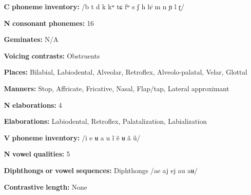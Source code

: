 \begin{styleBody}
\textbf{C} \textbf{phoneme} \textbf{inventory:} /b t d k kʷ tɕ fʷ s ʃ h hʲ m n ɲ l ɽ/
\end{styleBody}

\begin{styleBody}
\textbf{N} \textbf{consonant} \textbf{phonemes:} 16
\end{styleBody}

\begin{styleBody}
\textbf{Geminates:} N/A
\end{styleBody}

\begin{styleBody}
\textbf{Voicing} \textbf{contrasts:} Obstruents
\end{styleBody}

\begin{styleBody}
\textbf{Places:} Bilabial, Labiodental, Alveolar, Retroflex, Alveolo-palatal, Velar, Glottal
\end{styleBody}

\begin{styleBody}
\textbf{Manners:} Stop, Affricate, Fricative, Nasal, Flap/tap, Lateral approximant
\end{styleBody}

\begin{styleBody}
\textbf{N} \textbf{elaborations:} 4
\end{styleBody}

\begin{styleBody}
\textbf{Elaborations:} Labiodental, Retroflex, Palatalization, Labialization
\end{styleBody}

\begin{styleBody}
\textbf{V} \textbf{phoneme} \textbf{inventory:} /i e ʉ a u ĩ ẽ ʉ ã ũ/
\end{styleBody}

\begin{styleBody}
\textbf{N} \textbf{vowel} \textbf{qualities:} 5
\end{styleBody}

\begin{styleBody}
\textbf{Diphthongs} \textbf{or} \textbf{vowel} \textbf{sequences:} Diphthongs /ae aj ej au aʉ/
\end{styleBody}

\begin{styleBody}
\textbf{Contrastive} \textbf{length:} None
\end{styleBody}

